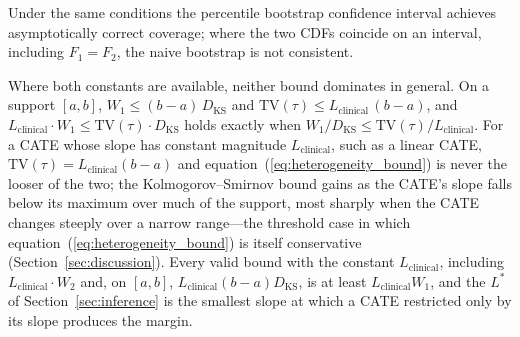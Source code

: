 \documentclass[AMA,Times1COL]{WileyNJDv5}
\begin{document}
Under the same conditions the percentile bootstrap confidence interval achieves asymptotically correct coverage;\cite{fang2019} where the two CDFs coincide on an interval, including $F_1 = F_2$, the naive bootstrap is not consistent.\cite{dumbgen1993,fang2019}


Where both constants are available, neither bound dominates in general. On a support $[a, b]$, $W_1 \leq (b - a)\,D_{\text{KS}}$ and $\mathrm{TV}(\tau) \leq L_{\text{clinical}}\,(b - a)$, and $L_{\text{clinical}} \cdot W_1 \leq \mathrm{TV}(\tau) \cdot D_{\text{KS}}$ holds exactly when $W_1 / D_{\text{KS}} \leq \mathrm{TV}(\tau) / L_{\text{clinical}}$. For a CATE whose slope has constant magnitude $L_{\text{clinical}}$, such as a linear CATE, $\mathrm{TV}(\tau) = L_{\text{clinical}}(b - a)$ and equation~(\ref{eq:heterogeneity_bound}) is never the looser of the two; the Kolmogorov--Smirnov bound gains as the CATE's slope falls below its maximum over much of the support, most sharply when the CATE changes steeply over a narrow range---the threshold case in which equation~(\ref{eq:heterogeneity_bound}) is itself conservative (Section~\ref{sec:discussion}). Every valid bound with the constant $L_{\text{clinical}}$, including $L_{\text{clinical}} \cdot W_2$ and, on $[a, b]$, $L_{\text{clinical}} (b - a) D_{\text{KS}}$, is at least $L_{\text{clinical}} W_1$, and the $L^*$ of Section~\ref{sec:inference} is the smallest slope at which a CATE restricted only by its slope produces the margin.
\end{document}
